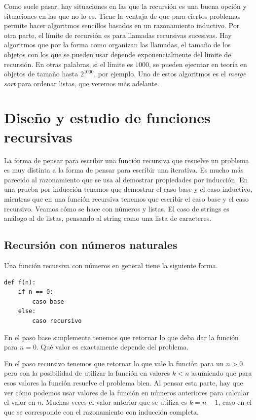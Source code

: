 \documentclass[a4paper, 12pt]{report}
\theoremstyle{definition}
\begin{document}
Como suele pasar, hay situaciones en las que la recursión es una buena opción y situaciones en las que no lo es. Tiene la ventaja de que para ciertos problemas permite hacer algoritmos sencillos basados en un razonamiento inductivo. Por otra parte, el límite de recursión es para llamadas recursivas sucesivas. Hay algoritmos que por la forma como organizan las llamadas, el tamaño de los objetos con los que se pueden usar depende exponencialmente del límite de recursión. En otras palabras, si el límite es $1000$, se pueden ejecutar en teoría en objetos de tamaño hasta $2^{1000}$, por ejemplo. Uno de estos algoritmos es el {\sl merge sort} para ordenar listas, que veremos más adelante.

\section{Diseño y estudio de funciones recursivas}

La forma de pensar para escribir una función recursiva que resuelve un problema es muy distinta a la forma de pensar para escribir una iterativa. Es mucho más parecido al razonamiento que se usa al demostrar propiedades por inducción. En una prueba por inducción tenemos que demostrar el caso base y el caso inductivo, mientras que en una función recursiva tenemos que escribir el caso base y el caso recursivo. Veamos cómo se hace con números y listas. El caso de strings es análogo al de listas, pensando al string como una lista de caracteres.

\subsection{Recursión con números naturales}

Una función recursiva con números en general tiene la siguiente forma.
\begin{verbatim}
def f(n):
    if n == 0:
        caso base
    else:
        caso recursivo
\end{verbatim}

En el paso base simplemente tenemos que retornar lo que deba dar la función para $n=0$. Qué valor es exactamente depende del problema.

En el paso recursivo tenemos que retornar lo que vale la función para un $n>0$ pero con la posibilidad de utilizar la función en valores $k<n$ asumiendo que para esos valores la función resuelve el problema bien. Al pensar esta parte, hay que ver cómo podemos usar valores de la función en números anteriores para calcular el valor en $n$. Muchas veces el valor anterior que se utiliza es $k=n-1$, caso en el que se corresponde con el razonamiento con inducción completa.
\end{document}
